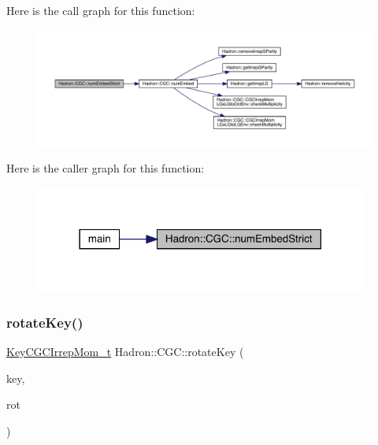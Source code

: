 Here is the call graph for this function\+:\nopagebreak
\begin{figure}[H]
\begin{center}
\leavevmode
\includegraphics[width=350pt]{d9/d19/namespaceHadron_1_1CGC_af5aac6c0d70eb7159aa635525bac7629_cgraph}
\end{center}
\end{figure}
Here is the caller graph for this function\+:\nopagebreak
\begin{figure}[H]
\begin{center}
\leavevmode
\includegraphics[width=310pt]{d9/d19/namespaceHadron_1_1CGC_af5aac6c0d70eb7159aa635525bac7629_icgraph}
\end{center}
\end{figure}
\mbox{\label{namespaceHadron_1_1CGC_acdc26e4dd88e281dc6675da8d6d1b13d}} 
\subsubsection{\texorpdfstring{rotateKey()}{rotateKey()}\hspace{0.1cm}{\footnotesize\ttfamily [1/2]}}
{\footnotesize\ttfamily \mbox{\hyperlink{structHadron_1_1KeyCGCIrrepMom__t}{Key\+C\+G\+C\+Irrep\+Mom\+\_\+t}} Hadron\+::\+C\+G\+C\+::rotate\+Key (\begin{DoxyParamCaption}\item[{const \mbox{\hyperlink{structHadron_1_1KeyCGCIrrepMom__t}{Key\+C\+G\+C\+Irrep\+Mom\+\_\+t}} \&}]{key,  }\item[{const \mbox{\hyperlink{structHadron_1_1RotateVec__t}{Rotate\+Vec\+\_\+t}} \&}]{rot }\end{DoxyParamCaption})}

